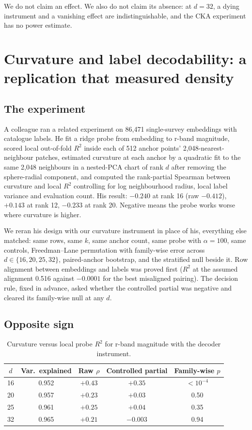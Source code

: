 \documentclass[11pt,a4paper]{article}
\begin{document}
We do not claim an effect. We also do not claim its absence: at $d = 32$, a dying instrument and a vanishing effect are indistinguishable, and the CKA experiment has no power estimate.

\section{Curvature and label decodability: a replication that measured density}
\label{sec:decodability}

\subsection{The experiment}

A colleague ran a related experiment on 86{,}471 single-survey embeddings with catalogue labels. He fit a ridge probe from embedding to r-band magnitude, scored local out-of-fold $R^2$ inside each of 512 anchor points' 2{,}048-nearest-neighbour patches, estimated curvature at each anchor by a quadratic fit to the same 2{,}048 neighbours in a nested-PCA chart of rank $d$ after removing the sphere-radial component, and computed the rank-partial Spearman between curvature and local $R^2$ controlling for log neighbourhood radius, local label variance and evaluation count. His result: $-0.240$ at rank 16 (raw $-0.412$), $+0.143$ at rank 12, $-0.233$ at rank 20. Negative means the probe works worse where curvature is higher.

We reran his design with our curvature instrument in place of his, everything else matched: same rows, same $k$, same anchor count, same probe with $\alpha = 100$, same controls, Freedman--Lane permutation with family-wise error across $d \in \{16, 20, 25, 32\}$, paired-anchor bootstrap, and the stratified null beside it. Row alignment between embeddings and labels was proved first ($R^2$ at the assumed alignment 0.516 against $-0.0001$ for the best misaligned pairing). The decision rule, fixed in advance, asked whether the controlled partial was negative and cleared its family-wise null at any $d$.

\subsection{Opposite sign}

\begin{table}[h]
\centering
\begin{tabular}{ccccc}
\toprule
$d$ & Var.\ explained & Raw $\rho$ & Controlled partial & Family-wise $p$ \\
\midrule
16 & 0.952 & $+0.43$ & $+0.35$ & $< 10^{-4}$ \\
20 & 0.957 & $+0.23$ & $+0.03$ & 0.50 \\
25 & 0.961 & $+0.25$ & $+0.04$ & 0.35 \\
32 & 0.965 & $+0.21$ & $-0.003$ & 0.94 \\
\bottomrule
\end{tabular}
\caption{Curvature versus local probe $R^2$ for r-band magnitude with the decoder instrument.}
\label{tab:phys}
\end{table}
\end{document}
